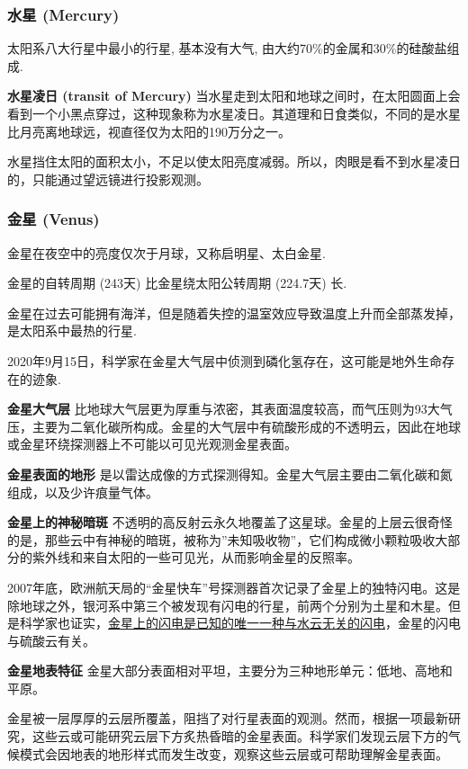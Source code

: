 \documentclass[12pt,a4paper]{article}
\begin{document}
	\subsubsection{水星 (Mercury)}
	
	太阳系八大行星中最小的行星, 基本没有大气, 由大约70\%的金属和30\%的硅酸盐组成.
	
	\textbf{水星凌日 (transit of Mercury)}
	当水星走到太阳和地球之间时，在太阳圆面上会看到一个小黑点穿过，这种现象称为水星凌日。其道理和日食类似，不同的是水星比月亮离地球远，视直径仅为太阳的190万分之一。
	
	水星挡住太阳的面积太小，不足以使太阳亮度减弱。所以，肉眼是看不到水星凌日的，只能通过望远镜进行投影观测。
	
	\subsubsection{金星 (Venus)}
	金星在夜空中的亮度仅次于月球，又称启明星、太白金星.
	
	金星的自转周期 (243天) 比金星绕太阳公转周期 (224.7天) 长.
	
	金星在过去可能拥有海洋，但是随着失控的温室效应导致温度上升而全部蒸发掉，是太阳系中最热的行星.
	
	2020年9月15日，科学家在金星大气层中侦测到磷化氢存在，这可能是地外生命存在的迹象.
	
	\textbf{金星大气层} 比地球大气层更为厚重与浓密，其表面温度较高，而气压则为93大气压，主要为二氧化碳所构成。金星的大气层中有硫酸形成的不透明云，因此在地球或金星环绕探测器上不可能以可见光观测金星表面。
	
	\textbf{金星表面的地形} 是以雷达成像的方式探测得知。金星大气层主要由二氧化碳和氮组成，以及少许痕量气体。
	
	\textbf{金星上的神秘暗斑} 不透明的高反射云永久地覆盖了这星球。金星的上层云很奇怪的是，那些云中有神秘的暗斑，被称为”未知吸收物”，它们构成微小颗粒吸收大部分的紫外线和来自太阳的一些可见光，从而影响金星的反照率。
	
	2007年底，欧洲航天局的“金星快车”号探测器首次记录了金星上的独特闪电。这是除地球之外，银河系中第三个被发现有闪电的行星，前两个分别为土星和木星。但是科学家也证实，\underline{金星上的闪电是已知的唯一一种与水云无关的闪电}，金星的闪电与硫酸云有关。
	
	\textbf{金星地表特征} 金星大部分表面相对平坦，主要分为三种地形单元：低地、高地和平原。
	
	金星被一层厚厚的云层所覆盖，阻挡了对行星表面的观测。然而，根据一项最新研究，这些云或可能研究云层下方炙热昏暗的金星表面。科学家们发现云层下方的气候模式会因地表的地形样式而发生改变，观察这些云层或可帮助理解金星表面。
	
\end{document}
